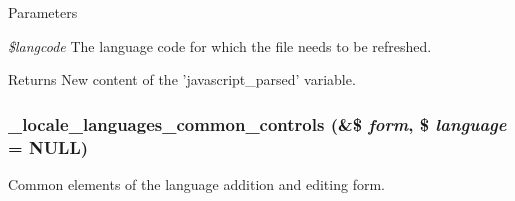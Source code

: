 \begin{DoxyParams}{Parameters}
\item[{\em \$langcode}]The language code for which the file needs to be refreshed.\end{DoxyParams}
\begin{DoxyReturn}{Returns}
New content of the 'javascript\_\-parsed' variable. 
\end{DoxyReturn}
\hypertarget{group__locale_gaa662af294a8422d2b73e6e05288b1b8d}{
\subsubsection[{\_\-locale\_\-languages\_\-common\_\-controls}]{\setlength{\rightskip}{0pt plus 5cm}\_\-locale\_\-languages\_\-common\_\-controls (\&\$ {\em form}, \/  \$ {\em language} = {\ttfamily NULL})}}
\label{group__locale_gaa662af294a8422d2b73e6e05288b1b8d}
Common elements of the language addition and editing form.


